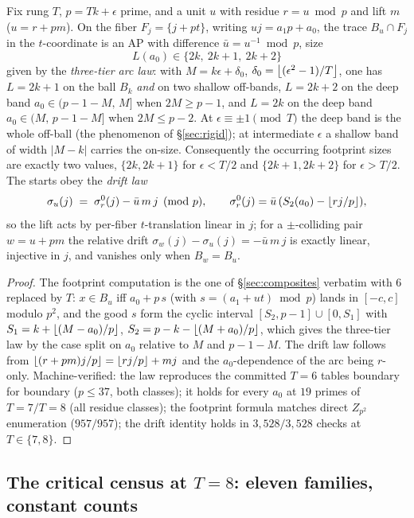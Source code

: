 \begin{lemma}
\label{lem:rungT}
Fix rung $T$, $p=Tk+\epsilon$ prime, and a unit $u$ with residue
$r=u\bmod p$ and lift $m$ ($u=r+pm$). On the fiber $F_j=\{j+pt\}$, writing
$uj=a_1p+a_0$, the trace $B_u\cap F_j$ in the $t$-coordinate is an AP
with difference $\bar u=u^{-1}\bmod p$, size
\[
L(a_0)\in\{2k,\ 2k+1,\ 2k+2\}
\]
given by the \emph{three-tier arc law}: with $M=k\epsilon+\delta_0$,
$\delta_0=\left\lfloor (\epsilon^2-1)/T \right\rfloor$, one has $L=2k+1$ on the ball $B_k$
\emph{and} on two shallow off-bands, $L=2k+2$ on the deep band
$a_0\in(p-1-M,\,M]$ when $2M\ge p-1$, and $L=2k$ on the deep band
$a_0\in(M,\,p-1-M]$ when $2M\le p-2$. At $\epsilon\equiv\pm1\pmod T$ the
deep band is the whole off-ball (the phenomenon of \S\ref{sec:rigid});
at intermediate $\epsilon$ a shallow band of width $|M-k|$ carries the
on-size. Consequently the occurring footprint sizes are exactly two
values, $\{2k,2k+1\}$ for $\epsilon<T/2$ and $\{2k+1,2k+2\}$ for
$\epsilon>T/2$. The starts obey the \emph{drift law}
\[
\sigma_u(j)\;=\;\sigma_r^0(j)-\bar u\,m\,j\pmod p,
\qquad \sigma_r^0(j)=\bar u\,(S_2(a_0)-\left\lfloor rj/p \right\rfloor),
\]
so the lift acts by per-fiber $t$-translation linear in $j$; for a
$\pm$-colliding pair $w=u+pm$ the relative drift
$\sigma_w(j)-\sigma_u(j)=-\bar u\,m\,j$ is exactly linear, injective in
$j$, and vanishes only when $B_w=B_u$.
\end{lemma}

\begin{proof}
The footprint computation is the one of \S\ref{sec:composites} verbatim
with $6$ replaced by $T$: $x\in B_u$ iff $a_0+p\,s$ (with
$s=(a_1+ut)\bmod p$) lands in $[-c,c]$ modulo $p^2$, and the good $s$
form the cyclic interval $[S_2,p-1]\cup[0,S_1]$ with
$S_1=k+\left\lfloor (M-a_0)/p \right\rfloor$, $S_2=p-k-\left\lfloor (M+a_0)/p \right\rfloor$, which gives the
three-tier law by the case split on $a_0$ relative to $M$ and $p-1-M$.
The drift law follows from $\left\lfloor (r+pm)j/p \right\rfloor=\left\lfloor rj/p \right\rfloor+mj$ and the
$a_0$-dependence of the arc being $r$-only. Machine-verified: the law
reproduces the committed $T=6$ tables boundary for boundary
($p\le37$, both classes); it holds for every $a_0$ at $19$ primes of
$T=7/T=8$ (all residue classes); the footprint formula matches direct
$Z_{p^2}$ enumeration ($957/957$); the drift identity holds in
$3{,}528/3{,}528$ checks at $T\in\{7,8\}$.
\end{proof}

\subsection{The critical census at \texorpdfstring{$T=8$}{T=8}: eleven families, constant counts}

